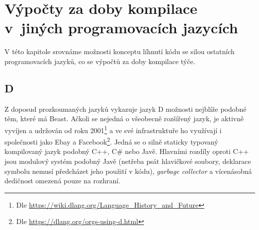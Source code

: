 \chapter{Výpočty za doby kompilace v~jiných programovacích jazycích}
V této kapitole srovnáme možnosti konceptu líhnutí kódu se silou ostatních programovacích jazyků, co se výpočtů za doby kompilace týče.


\section{D}
Z doposud prozkoumaných jazyků vykazuje jazyk D možnosti nejblíže podobné těm, které má Beast. Ačkoli se nejedná o všeobecně rozšířený jazyk, je aktivně vyvíjen a udržován od roku 2001\footnote{Dle \url{https://wiki.dlang.org/Language_History_and_Future}} a ve své infrastruktuře ho využívají i společnosti jako Ebay a Facebook\footnote{Dle \url{https://dlang.org/orgs-using-d.html}}. Jedná se o silně staticky typovaný kompilovaný jazyk podobný C++, C\# nebo Javě. Hlavními rozdíly oproti C++ jsou modulový systém podobný Javě (netřeba psát hlavičkové soubory, deklarace symbolu nemusí předcházet jeho použití v kódu), \textit{garbage collector} a vícenásobná dedičnost omezená pouze na rozhraní.

